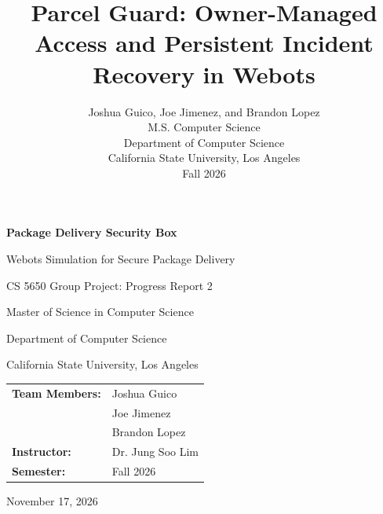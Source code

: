 \documentclass[conference,letterpaper]{IEEEtran}
\begin{document}
\onecolumn\thispagestyle{empty}
\vspace*{0.85in}
\begin{center}
{\fontsize{20}{24}\selectfont\bfseries Package Delivery Security Box\par}
\vspace{0.18in}
{\fontsize{16}{20}\selectfont Webots Simulation for Secure Package Delivery\par}
\vspace{0.55in}
{\fontsize{14}{18}\selectfont CS 5650 Group Project: Progress Report 2\par}
\vspace{0.12in}
{\fontsize{14}{17}\selectfont Master of Science in Computer Science\par Department of Computer Science\par California State University, Los Angeles\par}
\vspace{0.5in}
{\fontsize{12}{15}\selectfont
\begin{tabular}{@{}ll@{}}
\textbf{Team Members:} & Joshua Guico\\ & Joe Jimenez\\ & Brandon Lopez\\[0.18in]
\textbf{Instructor:} & Dr. Jung Soo Lim\\\textbf{Semester:} & Fall 2026
\end{tabular}\par}
\vfill{\large November 17, 2026\par}
\end{center}\clearpage
\thispagestyle{empty}\tableofcontents\clearpage
\twocolumn
\title{Parcel Guard: Owner-Managed Access and Persistent Incident Recovery in Webots}
\author{Joshua Guico, Joe Jimenez, and Brandon Lopez\\M.S. Computer Science\\Department of Computer Science\\California State University, Los Angeles\\Fall 2026}
\maketitle
\end{document}
